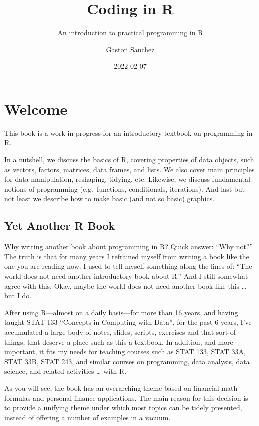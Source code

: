 \documentclass[
]{book}
\title{Coding in R}
\subtitle{An introduction to practical programming in R}
\author{Gaston Sanchez}
\date{2022-02-07}
\begin{document}
\maketitle

{
\setcounter{tocdepth}{1}
\tableofcontents
}
\hypertarget{welcome}{%
\chapter*{Welcome}\label{welcome}}

This book is a work in progress for an introductory textbook on programming in R.

In a nutshell, we discuss the basics of R, covering properties of data objects,
such as vectors, factors, matrices, data frames, and lists. We also cover
main principles for data manipulation, reshaping, tidying, etc. Likewise, we
discuss fundamental notions of programming (e.g.~functions, conditionals,
iterations). And last but not least we describe how to make basic (and not so
basic) graphics.

\hypertarget{yet-another-r-book}{%
\section*{Yet Another R Book}\label{yet-another-r-book}}

Why writing another book about programming in R? Quick answer: ``Why not?''
The truth is that for many years I refrained myself from writing a book like
the one you are reading now. I used to tell myself something along the lines
of: ``The world does not need another introductory book about R.'' And I still
somewhat agree with this. Okay, maybe the world does not need another book
like this \ldots{} but I do.

After using R---almost on a daily basis---for more than 16 years, and
having taught STAT 133 ``Concepts in Computing with Data'', for the past 6 years,
I've accumulated a large body of notes, slides, scripts, exercises and that
sort of things, that deserve a place such as this a textbook. In addition, and
more important, it fits my needs for teaching courses such as STAT 133, STAT 33A,
STAT 33B, STAT 243, and similar courses on programming, data analysis, data
science, and related activities \ldots{} with R.

As you will see, the book has an overarching theme based on financial math
formulas and personal finance applications. The main reason for this decision
is to provide a unifying theme under which most topics can be tidely presented,
instead of offering a number of examples in a vacuum.
\end{document}
